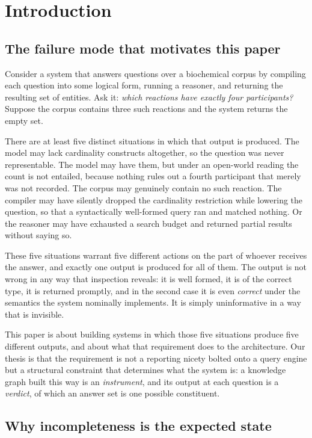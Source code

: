 \documentclass[11pt,a4paper]{article}
\theoremstyle{plain}
\theoremstyle{definition}
\theoremstyle{remark}
\begin{document}
\tableofcontents

\section{Introduction}

\subsection{The failure mode that motivates this paper}

Consider a system that answers questions over a biochemical corpus by
compiling each question into some logical form, running a reasoner, and
returning the resulting set of entities. Ask it: \emph{which reactions have
exactly four participants?} Suppose the corpus contains three such reactions
and the system returns the empty set.

There are at least five distinct situations in which that output is produced.
The model may lack cardinality constructs altogether, so the question was never
representable. The model may have them, but under an open-world reading the
count is not entailed, because nothing rules out a fourth participant that
merely was not recorded. The corpus may genuinely contain no such reaction.
The compiler may have silently dropped the cardinality restriction while
lowering the question, so that a syntactically well-formed query ran and
matched nothing. Or the reasoner may have exhausted a search budget and
returned partial results without saying so.

These five situations warrant five different actions on the part of whoever
receives the answer, and exactly one output is produced for all of them. The
output is not wrong in any way that inspection reveals: it is well formed, it
is of the correct type, it is returned promptly, and in the second case it is
even \emph{correct} under the semantics the system nominally implements. It is
simply uninformative in a way that is invisible.

This paper is about building systems in which those five situations produce
five different outputs, and about what that requirement does to the
architecture. Our thesis is that the requirement is not a reporting nicety
bolted onto a query engine but a structural constraint that determines what
the system is: a knowledge graph built this way is an \emph{instrument}, and
its output at each question is a \emph{verdict}, of which an answer set is one
possible constituent.

\subsection{Why incompleteness is the expected state}
\end{document}
